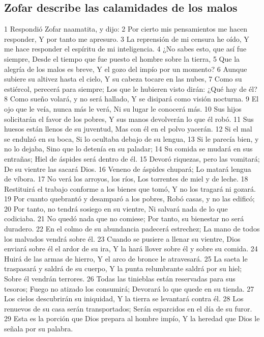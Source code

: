 \subsection*{Zofar describe las calamidades de los malos}  

1 Respondió Zofar naamatita, y dijo:  
2 Por cierto mis pensamientos me hacen responder,  
Y por tanto me apresuro.  
3 La reprensión de mi censura he oído,  
Y me hace responder el espíritu de mi inteligencia.  
4 ¿No sabes esto, que así fue siempre,  
Desde el tiempo que fue puesto el hombre sobre la tierra,  
5 Que la alegría de los malos es breve,  
Y el gozo del impío por un momento?  
6 Aunque subiere su altivez hasta el cielo,  
Y su cabeza tocare en las nubes,  
7 Como su estiércol, perecerá para siempre;  
Los que le hubieren visto dirán: ¿Qué hay de él?  
8 Como sueño volará, y no será hallado,  
Y se disipará como visión nocturna.  
9 El ojo que le veía, nunca más le verá,  
Ni su lugar le conocerá más.  
10 Sus hijos solicitarán el favor de los pobres,  
Y sus manos devolverán lo que él robó. 
11 Sus huesos están llenos de su juventud,  
Mas con él en el polvo yacerán.  
12 Si el mal se endulzó en su boca,  
Si lo ocultaba debajo de su lengua,  
13 Si le parecía bien, y no lo dejaba,  
Sino que lo detenía en su paladar;  
14 Su comida se mudará en sus entrañas;  
Hiel de áspides será dentro de él.  
15 Devoró riquezas, pero las vomitará;  
De su vientre las sacará Dios.  
16 Veneno de áspides chupará;  
Lo matará lengua de víbora.  
17 No verá los arroyos, los ríos, 
Los torrentes de miel y de leche.  
18 Restituirá el trabajo conforme a los bienes que tomó,  
Y no los tragará ni gozará.  
19 Por cuanto quebrantó y desamparó a los pobres,  
Robó casas, y no las edificó;  
20 Por tanto, no tendrá sosiego en su vientre,  
Ni salvará nada de lo que codiciaba. 
21 No quedó nada que no comiese;  
Por tanto, su bienestar no será duradero. 
22 En el colmo de su abundancia padecerá estrechez;  
La mano de todos los malvados vendrá sobre él.  
23 Cuando se pusiere a llenar su vientre,  
Dios enviará sobre él el ardor de su ira,  
Y la hará llover sobre él y sobre su comida.  
24 Huirá de las armas de hierro,  
Y el arco de bronce le atravesará.  
25 La saeta le traspasará y saldrá de su cuerpo,  
Y la punta relumbrante saldrá por su hiel;  
Sobre él vendrán terrores.  
26 Todas las tinieblas están reservadas para sus tesoros;  
Fuego no atizado los consumirá;  
Devorará lo que quede en su tienda.  
27 Los cielos descubrirán su iniquidad,  
Y la tierra se levantará contra él.  
28 Los renuevos de su casa serán transportados;  
Serán esparcidos en el día de su furor.  
29 Esta es la porción que Dios prepara al hombre impío,  
Y la heredad que Dios le señala por su palabra.  

